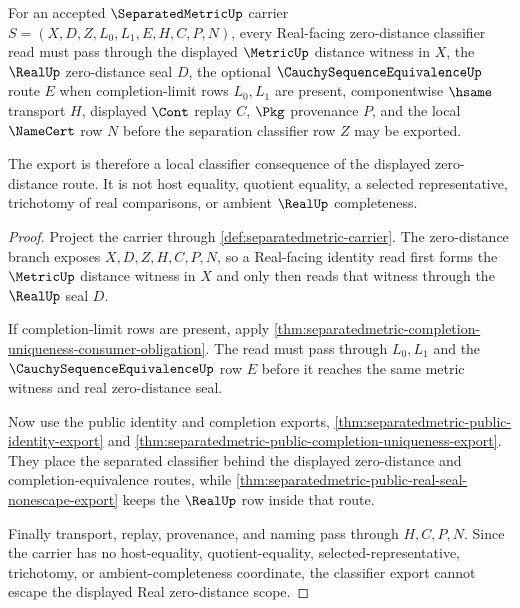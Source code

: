 \begin{theorem}
\label{thm:separatedmetric-real-zero-distance-scope-direct}
For an accepted $\SeparatedMetricUp$ carrier $S=(X,D,Z,L_0,L_1,E,H,C,P,N)$, every Real-facing zero-distance classifier read must pass through the displayed $\MetricUp$ distance witness in $X$, the $\RealUp$ zero-distance seal $D$, the optional $\CauchySequenceEquivalenceUp$ route $E$ when completion-limit rows $L_0,L_1$ are present, componentwise $\hsame$ transport $H$, displayed $\Cont$ replay $C$, $\Pkg$ provenance $P$, and the local $\NameCert$ row $N$ before the separation classifier row $Z$ may be exported.

The export is therefore a local classifier consequence of the displayed zero-distance route. It is not host equality, quotient equality, a selected representative, trichotomy of real comparisons, or ambient $\RealUp$ completeness.
\end{theorem}
\begin{proof}
Project the carrier through \autoref{def:separatedmetric-carrier}. The zero-distance branch exposes $X,D,Z,H,C,P,N$, so a Real-facing identity read first forms the $\MetricUp$ distance witness in $X$ and only then reads that witness through the $\RealUp$ seal $D$.

If completion-limit rows are present, apply \autoref{thm:separatedmetric-completion-uniqueness-consumer-obligation}. The read must pass through $L_0,L_1$ and the $\CauchySequenceEquivalenceUp$ row $E$ before it reaches the same metric witness and real zero-distance seal.

Now use the public identity and completion exports, \autoref{thm:separatedmetric-public-identity-export} and \autoref{thm:separatedmetric-public-completion-uniqueness-export}. They place the separated classifier behind the displayed zero-distance and completion-equivalence routes, while \autoref{thm:separatedmetric-public-real-seal-nonescape-export} keeps the $\RealUp$ row inside that route.

Finally transport, replay, provenance, and naming pass through $H,C,P,N$. Since the carrier has no host-equality, quotient-equality, selected-representative, trichotomy, or ambient-completeness coordinate, the classifier export cannot escape the displayed Real zero-distance scope.
\end{proof}
